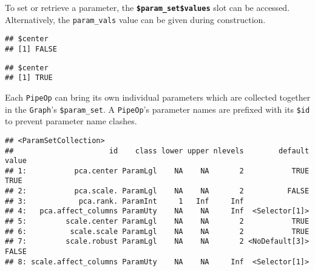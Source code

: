 \documentclass[
]{scrbook}
\newenvironment{Shaded}{\begin{snugshade}}{\end{snugshade}}
\newcommand{\AttributeTok}[1]{\textcolor[rgb]{0.77,0.63,0.00}{#1}}
\newcommand{\ConstantTok}[1]{\textcolor[rgb]{0.00,0.00,0.00}{#1}}
\newcommand{\FunctionTok}[1]{\textcolor[rgb]{0.00,0.00,0.00}{#1}}
\newcommand{\NormalTok}[1]{#1}
\newcommand{\OtherTok}[1]{\textcolor[rgb]{0.56,0.35,0.01}{#1}}
\newcommand{\SpecialCharTok}[1]{\textcolor[rgb]{0.00,0.00,0.00}{#1}}
\newcommand{\StringTok}[1]{\textcolor[rgb]{0.31,0.60,0.02}{#1}}
\renewenvironment{Shaded} {\begin{snugshade}\small} {\end{snugshade}}
\begin{document}
To set or retrieve a parameter, the \textbf{\texttt{\$param\_set\$values}} slot can be accessed.
Alternatively, the \texttt{param\_vals} value can be given during construction.

\begin{Shaded}
\end{Shaded}

\begin{verbatim}
## $center
## [1] FALSE
\end{verbatim}

\begin{Shaded}
\end{Shaded}

\begin{verbatim}
## $center
## [1] TRUE
\end{verbatim}

Each \texttt{PipeOp} can bring its own individual parameters which are collected together in the \texttt{Graph}'s \texttt{\$param\_set}.
A \texttt{PipeOp}'s parameter names are prefixed with its \texttt{\$id} to prevent parameter name clashes.

\begin{Shaded}
\end{Shaded}

\begin{verbatim}
## <ParamSetCollection>
##                      id    class lower upper nlevels        default value
## 1:           pca.center ParamLgl    NA    NA       2           TRUE  TRUE
## 2:           pca.scale. ParamLgl    NA    NA       2          FALSE      
## 3:            pca.rank. ParamInt     1   Inf     Inf                     
## 4:   pca.affect_columns ParamUty    NA    NA     Inf  <Selector[1]>      
## 5:         scale.center ParamLgl    NA    NA       2           TRUE      
## 6:          scale.scale ParamLgl    NA    NA       2           TRUE      
## 7:         scale.robust ParamLgl    NA    NA       2 <NoDefault[3]> FALSE
## 8: scale.affect_columns ParamUty    NA    NA     Inf  <Selector[1]>
\end{verbatim}
\end{document}
